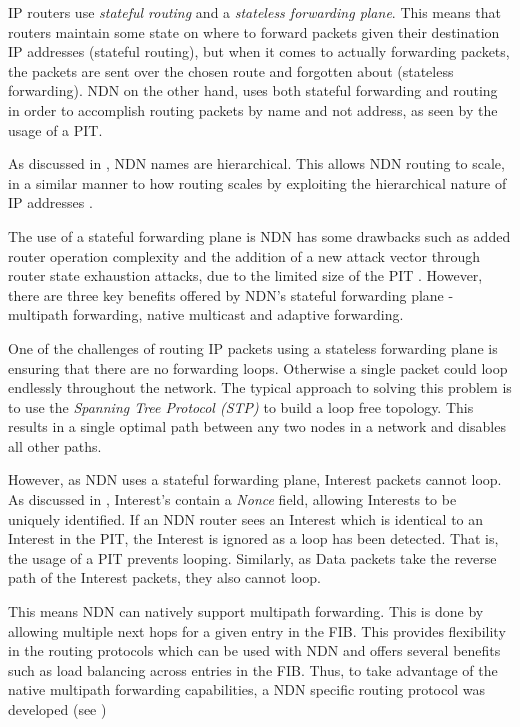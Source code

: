 IP routers use \textit{stateful routing} and a \textit{stateless forwarding plane}. This means that routers maintain some state on where to forward packets given their destination IP addresses (stateful routing), but when it comes to actually forwarding packets, the packets are sent over the chosen route and forgotten about (stateless forwarding). NDN on the other hand, uses both stateful forwarding and routing \cite{stateful-forwarding} in order to accomplish routing packets by name and not address, as seen by the usage of a PIT. 

As discussed in , NDN names are hierarchical. This allows NDN routing to scale, in a similar manner to how routing scales by exploiting the hierarchical nature of IP addresses \cite{stateful-forwarding}.

The use of a stateful forwarding plane is NDN has some drawbacks such as added router operation complexity and the addition of a new attack vector through router state exhaustion attacks, due to the limited size of the PIT \cite{case-against-stateful-forwarding}. However, there are three key benefits offered by NDN's stateful forwarding plane - multipath forwarding, native multicast and adaptive forwarding.

 \label{sec:multipath-forwarding}
One of the challenges of routing IP packets using a stateless forwarding plane is ensuring that there are no forwarding loops. Otherwise a single packet could loop endlessly throughout the network. The typical approach to solving this problem is to use the \textit{Spanning Tree Protocol (STP)} \cite{spanning-tree-protocol} to build a loop free topology. This results in a single optimal path between any two nodes in a network and disables all other paths.

However, as NDN uses a stateful forwarding plane, Interest packets cannot loop. As discussed in , Interest's contain a \textit{Nonce} field, allowing Interests to be uniquely identified. If an NDN router sees an Interest which is identical to an Interest in the PIT, the Interest is ignored as a loop has been detected. That is, the usage of a PIT prevents looping. Similarly, as Data packets take the reverse path of the Interest packets, they also cannot loop. 

This means NDN can natively support multipath forwarding. This is done by allowing multiple next hops for a given entry in the FIB. This provides flexibility in the routing protocols which can be used with NDN and offers several benefits such as load balancing across entries in the FIB. Thus, to take advantage of the native multipath forwarding capabilities, a NDN specific routing protocol was developed (see )

